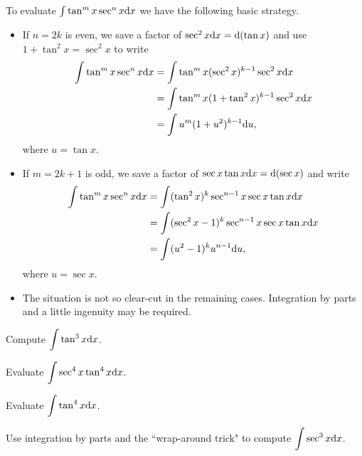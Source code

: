 \newpage

\begin{remark}
To evaluate $\int\tan^m x\sec^n x\mathrm{d} x$ we have the following basic strategy.
\begin{itemize}
\item If $n=2k$ is even, we save a factor of $\sec^2 x\mathrm{d} x = \mathrm{d}(\tan x)$ and use $1+\tan^2 x = \sec^2 x$ to write
\begin{equation*}
\begin{split}
\int\tan^m x\sec^n x\mathrm{d} x &= \int\tan^m x(\sec^2 x)^{k-1}\sec^2 x\mathrm{d} x\\
&= \int\tan^m x(1+\tan^2 x)^{k-1}\sec^2 x\mathrm{d} x\\
&= \int u^m (1+u^2)^{k-1}\mathrm{d} u,
\end{split}
\end{equation*}
where $u=\tan x$.
\item If $m=2k+1$ is odd, we save a factor of $\sec x\tan x\mathrm{d} x = \mathrm{d}(\sec x)$ and write
\begin{equation*}
\begin{split}
\int\tan^m x\sec^n x\mathrm{d} x &= \int (\tan^{2} x)^k\sec^{n-1} x\sec x\tan x\mathrm{d} x\\
&= \int (\sec^{2} x -1)^k\sec^{n-1} x\sec x\tan x\mathrm{d} x\\
&= \int (u^2 -1)^ku^{n-1} \mathrm{d} u,
\end{split}
\end{equation*}
where $u=\sec x$.
\item The situation is not so clear-cut in the remaining cases.
Integration by parts and a little ingenuity may be required.
\end{itemize}
\end{remark}

\begin{example}
Compute $\displaystyle\int\tan^3 x\mathrm{d} x$.
\end{example}
\vfill

\newpage

\begin{example}
Evaluate $\displaystyle\int\sec^4 x\tan^4 x\mathrm{d} x$.
\end{example}
\vfill

\begin{example}
Evaluate $\displaystyle\int\tan^4 x\mathrm{d} x$.
\end{example}
\vfill

\newpage

\begin{example}
Use integration by parts and the ``wrap-around trick" to compute $\displaystyle\int\sec^3 x\mathrm{d} x$.
\end{example}
\vfill

